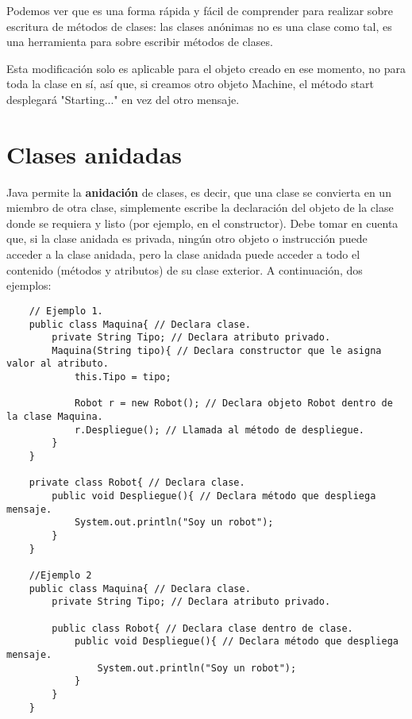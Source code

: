 Podemos ver que es una forma rápida y fácil de comprender para realizar sobre escritura de métodos de clases: las clases anónimas no es una clase como tal, es una herramienta para sobre escribir métodos de clases.

Esta modificación solo es aplicable para el objeto creado en ese momento, no para toda la clase en sí, así que, si creamos otro objeto Machine, el método start desplegará "Starting..." en vez del otro mensaje.



\section{Clases anidadas}

Java permite la \textbf{anidación} de clases, es decir, que una clase se convierta en un miembro de otra clase, simplemente escribe la declaración del objeto de la clase donde se requiera y listo (por ejemplo, en el constructor). Debe tomar en cuenta que, si la clase anidada es privada, ningún otro objeto o instrucción puede acceder a la clase anidada, pero la clase anidada puede acceder a todo el contenido (métodos y atributos) de su clase exterior. A continuación, dos ejemplos:
\begin{lstlisting}
    // Ejemplo 1.
    public class Maquina{ // Declara clase.
        private String Tipo; // Declara atributo privado.
        Maquina(String tipo){ // Declara constructor que le asigna valor al atributo.
            this.Tipo = tipo;
            
            Robot r = new Robot(); // Declara objeto Robot dentro de la clase Maquina.
            r.Despliegue(); // Llamada al método de despliegue.
        }
    }
    
    private class Robot{ // Declara clase.
        public void Despliegue(){ // Declara método que despliega mensaje.
            System.out.println("Soy un robot");
        }
    }
    
    //Ejemplo 2
    public class Maquina{ // Declara clase.
        private String Tipo; // Declara atributo privado.
        
        public class Robot{ // Declara clase dentro de clase.
            public void Despliegue(){ // Declara método que despliega mensaje.
                System.out.println("Soy un robot");
            }
        }
    }
\end{lstlisting}
